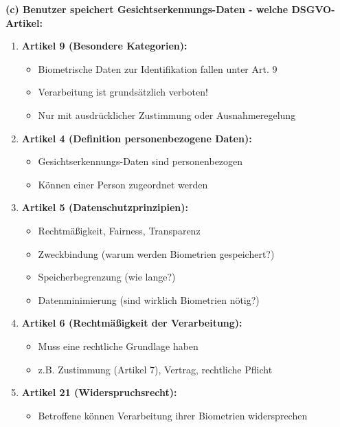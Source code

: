 \documentclass[12pt,a4paper]{article}
\begin{document}
\begin{tcolorbox}[colback=solutionbg, colframe=black!30]

\textbf{(c) Benutzer speichert Gesichtserkennungs-Daten - welche DSGVO-Artikel:} \checkmark

\begin{enumerate}[1.]
    \item \textbf{Artikel 9 (Besondere Kategorien):}
    \begin{itemize}
        \item Biometrische Daten zur Identifikation fallen unter Art. 9
        \item Verarbeitung ist grundsätzlich verboten!
        \item Nur mit ausdrücklicher Zustimmung oder Ausnahmeregelung
    \end{itemize}
    
    \item \textbf{Artikel 4 (Definition personenbezogene Daten):}
    \begin{itemize}
        \item Gesichtserkennungs-Daten sind personenbezogen
        \item Können einer Person zugeordnet werden
    \end{itemize}
    
    \item \textbf{Artikel 5 (Datenschutzprinzipien):}
    \begin{itemize}
        \item Rechtmäßigkeit, Fairness, Transparenz
        \item Zweckbindung (warum werden Biometrien gespeichert?)
        \item Speicherbegrenzung (wie lange?)
        \item Datenminimierung (sind wirklich Biometrien nötig?)
    \end{itemize}
    
    \item \textbf{Artikel 6 (Rechtmäßigkeit der Verarbeitung):}
    \begin{itemize}
        \item Muss eine rechtliche Grundlage haben
        \item z.B. Zustimmung (Artikel 7), Vertrag, rechtliche Pflicht
    \end{itemize}
    
    \item \textbf{Artikel 21 (Widerspruchsrecht):}
    \begin{itemize}
        \item Betroffene können Verarbeitung ihrer Biometrien widersprechen
    \end{itemize}
    

\end{enumerate}
\end{tcolorbox}
\end{document}
